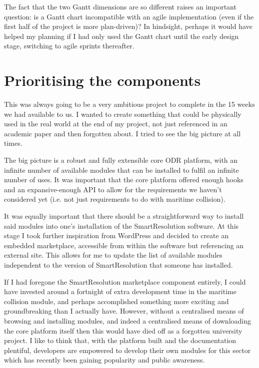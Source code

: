 The fact that the two Gantt dimensions are so different raises an important question: is a Gantt chart incompatible with an agile implementation (even if the first half of the project is more plan-driven)? In hindsight, perhaps it would have helped my planning if I had only used the Gantt chart until the early design stage, switching to agile sprints thereafter.

\section{Prioritising the components}

This was always going to be a very ambitious project to complete in the 15 weeks we had available to us. I wanted to create something that could be physically used in the real world at the end of my project, not just referenced in an academic paper and then forgotten about. I tried to see the big picture at all times.

The big picture is a robust and fully extensible core ODR platform, with an infinite number of available modules that can be installed to fulfil an infinite number of uses. It was important that the core platform offered enough hooks and an expansive-enough API to allow for the requirements we haven't considered yet (i.e. not just requirements to do with maritime collision).

It was equally important that there should be a straightforward way to install said modules into one's installation of the SmartResolution software. At this stage I took further inspiration from WordPress and decided to create an embedded marketplace, accessible from within the software but referencing an external site. This allows for me to update the list of available modules independent to the version of SmartResolution that someone has installed.

If I had foregone the SmartResolution marketplace component entirely, I could have invested around a fortnight of extra development time in the maritime collision module, and perhaps accomplished something more exciting and groundbreaking than I actually have. However, without a centralised means of browsing and installing modules, and indeed a centralised means of downloading the core platform itself  then this would have died off as a forgotten university project. I like to think that, with the platform built and the documentation plentiful, developers are empowered to develop their own modules for this sector which has recently been gaining popularity and public awareness.


